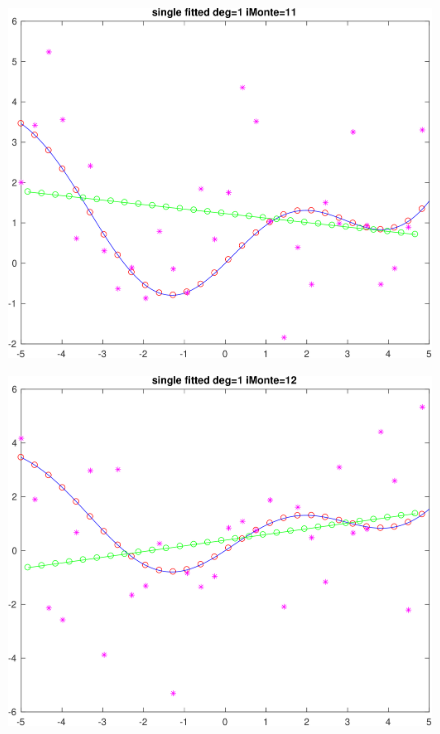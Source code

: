 \begin{figure}[h!]
\centering\includegraphics[scale=0.1]{single_poly_d_1_iMonte_11.png}
\end{figure}


\begin{figure}[h!]
\centering\includegraphics[scale=0.1]{single_poly_d_1_iMonte_12.png}
\end{figure}



